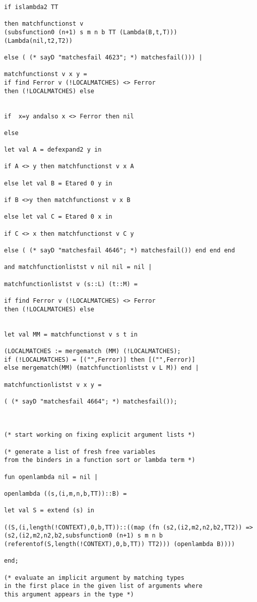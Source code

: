 \documentclass[12pt]{article}
\begin{document}
\begin{verbatim}
if islambda2 TT 

then matchfunctionst v
(subsfunction0 (n+1) s m n b TT (Lambda(B,t,T)))
(Lambda(nil,t2,T2))

else ( (* sayD "matchesfail 4623"; *) matchesfail())) |

matchfunctionst v x y = 
if find Ferror v (!LOCALMATCHES) <> Ferror 
then (!LOCALMATCHES) else


if  x=y andalso x <> Ferror then nil

else 

let val A = defexpand2 y in 

if A <> y then matchfunctionst v x A

else let val B = Etared 0 y in

if B <>y then matchfunctionst v x B

else let val C = Etared 0 x in

if C <> x then matchfunctionst v C y

else ( (* sayD "matchesfail 4646"; *) matchesfail()) end end end

and matchfunctionlistst v nil nil = nil |

matchfunctionlistst v (s::L) (t::M) =

if find Ferror v (!LOCALMATCHES) <> Ferror 
then (!LOCALMATCHES) else


let val MM = matchfunctionst v s t in

(LOCALMATCHES := mergematch (MM) (!LOCALMATCHES);
if (!LOCALMATCHES) = [("",Ferror)] then [("",Ferror)]
else mergematch(MM) (matchfunctionlistst v L M)) end |

matchfunctionlistst v x y = 

( (* sayD "matchesfail 4664"; *) matchesfail());



(* start working on fixing explicit argument lists *)

(* generate a list of fresh free variables
from the binders in a function sort or lambda term *)

fun openlambda nil = nil |

openlambda ((s,(i,m,n,b,TT))::B) =

let val S = extend (s) in

((S,(i,length(!CONTEXT),0,b,TT))::((map (fn (s2,(i2,m2,n2,b2,TT2)) =>
(s2,(i2,m2,n2,b2,subsfunction0 (n+1) s m n b 
(referentof(S,length(!CONTEXT),0,b,TT)) TT2))) (openlambda B))))

end;

(* evaluate an implicit argument by matching types
in the first place in the given list of arguments where
this argument appears in the type *)


\end{verbatim}
\end{document}
